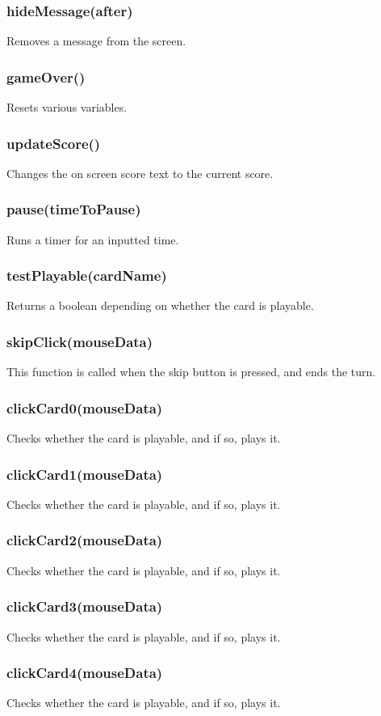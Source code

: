 \documentclass[12pt]{article}
\begin{document}
\subsubsection*{hideMessage(after)}
Removes a message from the screen.
\subsubsection*{gameOver()}
Resets various variables.
\subsubsection*{updateScore()}
Changes the on screen score text to the current score. 
\subsubsection*{pause(timeToPause)}
Runs a timer for an inputted time. 
\subsubsection*{testPlayable(cardName)}
Returns a boolean depending on whether the card is playable. 
\subsubsection*{skipClick(mouseData)}
This function is called when the skip button is pressed, and ends the turn. 
\subsubsection*{clickCard0(mouseData)}
Checks whether the card is playable, and if so, plays it. 
\subsubsection*{clickCard1(mouseData)}
Checks whether the card is playable, and if so, plays it. 
\subsubsection*{clickCard2(mouseData)}
Checks whether the card is playable, and if so, plays it. 
\subsubsection*{clickCard3(mouseData)}
Checks whether the card is playable, and if so, plays it. 
\subsubsection*{clickCard4(mouseData)}
Checks whether the card is playable, and if so, plays it. 
\end{document}
